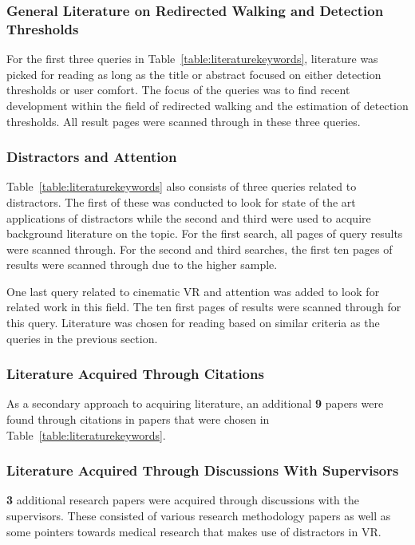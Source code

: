 \subsubsection{General Literature on Redirected Walking and Detection Thresholds}
For the first three queries in Table~\ref{table:literaturekeywords}, literature was picked for reading as long as the title or abstract focused on either detection thresholds or user comfort. The focus of the queries was to find recent development within the field of redirected walking and the estimation of detection thresholds. All result pages were scanned through in these three queries. 

\subsubsection{Distractors and Attention}
Table~\ref{table:literaturekeywords} also consists of three queries related to distractors. The first of these was conducted to look for state of the art applications of distractors while the second and third were used to acquire background literature on the topic. For the first search, all pages of query results were scanned through. For the second and third searches, the first ten pages of results were scanned through due to the higher sample. 

One last query related to cinematic VR and attention was added to look for related work in this field. The ten first pages of results were scanned through for this query.
Literature was chosen for reading based on similar criteria as the queries in the previous section.

\subsubsection{Literature Acquired Through Citations}
As a secondary approach to acquiring literature, an additional \textbf{9} papers were found through citations in papers that were chosen in Table~\ref{table:literaturekeywords}. 

\subsubsection{Literature Acquired Through Discussions With Supervisors}
\textbf{3} additional research papers were acquired through discussions with the supervisors. These consisted of various research methodology papers as well as some pointers towards medical research that makes use of distractors in VR.

